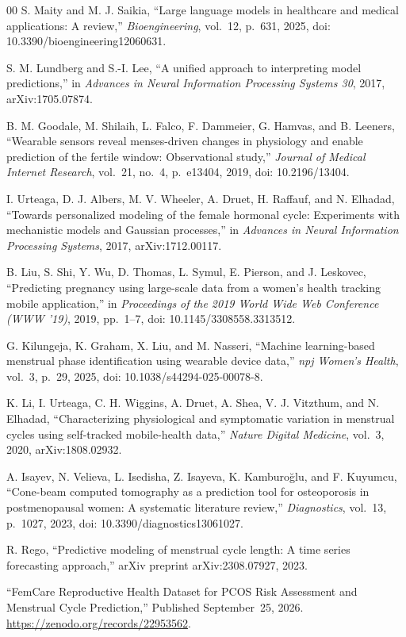 \begin{thebibliography}{00}
S. Maity and M. J. Saikia,
``Large language models in healthcare and medical applications: A review,''
\textit{Bioengineering}, vol.~12, p.~631, 2025,
doi: 10.3390/bioengineering12060631.

S. M. Lundberg and S.-I. Lee,
``A unified approach to interpreting model predictions,''
in \textit{Advances in Neural Information Processing Systems 30},
2017, arXiv:1705.07874.

B. M. Goodale, M. Shilaih, L. Falco, F. Dammeier,
G. Hamvas, and B. Leeners,
``Wearable sensors reveal menses-driven changes in physiology
and enable prediction of the fertile window: Observational study,''
\textit{Journal of Medical Internet Research},
vol.~21, no.~4, p.~e13404, 2019,
doi: 10.2196/13404.

I. Urteaga, D. J. Albers, M. V. Wheeler, A. Druet,
H. Raffauf, and N. Elhadad,
``Towards personalized modeling of the female hormonal cycle:
Experiments with mechanistic models and Gaussian processes,''
in \textit{Advances in Neural Information Processing Systems}, 2017,
arXiv:1712.00117.

B. Liu, S. Shi, Y. Wu, D. Thomas, L. Symul,
E. Pierson, and J. Leskovec,
``Predicting pregnancy using large-scale data from a women's
health tracking mobile application,''
in \textit{Proceedings of the 2019 World Wide Web Conference
(WWW '19)}, 2019, pp.~1--7,
doi: 10.1145/3308558.3313512.

G. Kilungeja, K. Graham, X. Liu, and M. Nasseri,
``Machine learning-based menstrual phase identification using
wearable device data,''
\textit{npj Women's Health}, vol.~3, p.~29, 2025,
doi: 10.1038/s44294-025-00078-8.

K. Li, I. Urteaga, C. H. Wiggins, A. Druet, A. Shea,
V. J. Vitzthum, and N. Elhadad,
``Characterizing physiological and symptomatic variation in
menstrual cycles using self-tracked mobile-health data,''
\textit{Nature Digital Medicine}, vol.~3, 2020,
arXiv:1808.02932.

A. Isayev, N. Velieva, L. Isedisha, Z. Isayeva,
K. Kamburo\u{g}lu, and F. Kuyumcu,
``Cone-beam computed tomography as a prediction tool for osteoporosis
in postmenopausal women: A systematic literature review,''
\textit{Diagnostics}, vol.~13, p.~1027, 2023,
doi: 10.3390/diagnostics13061027.

R. Rego,
``Predictive modeling of menstrual cycle length:
A time series forecasting approach,''
arXiv preprint arXiv:2308.07927, 2023.

``FemCare Reproductive Health Dataset for PCOS Risk Assessment
and Menstrual Cycle Prediction,''
Published September~25, 2026.
\url{https://zenodo.org/records/22953562}.

\end{thebibliography}
